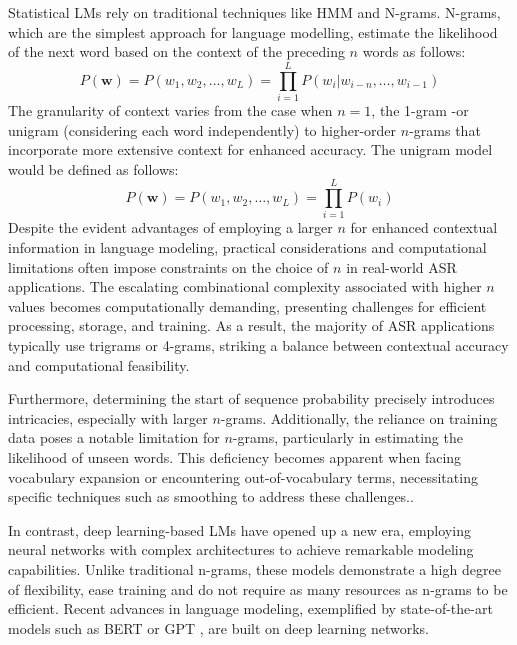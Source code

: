 Statistical \acp{LM} rely on traditional techniques like \ac{HMM} and N-grams. N-grams, which are the simplest approach for language modelling, estimate the likelihood of the next word based on the context of the preceding $n$ words as follows:
\begin{equation}
    P(\boldsymbol{w})= P(w_1 , w_2 ,\dots,w_L)  =\prod_{i=1}^L P(w_i| w_{i-n} , \dots,w_{i-1}  )
\end{equation}
The granularity of context varies from the case when $n=1$, the 1-gram -or unigram (considering each word independently) to higher-order $n$-grams that incorporate more extensive context for enhanced accuracy. The unigram model would be defined as follows:
\begin{equation}
    P(\boldsymbol{w})=P(w_1, w_2,\dots,w_L )  = \prod_{i=1}^L P(w_i)
\end{equation}
Despite the evident advantages of employing a larger $n$ for enhanced contextual information in language modeling, practical considerations and computational limitations often impose constraints on the choice of $n$ in real-world \ac{ASR} applications. The escalating combinational complexity associated with higher $n$ values becomes computationally demanding, presenting challenges for efficient processing, storage, and training. As a result, the majority of \ac{ASR} applications typically use trigrams or 4-grams, striking a balance between contextual accuracy and computational feasibility.

Furthermore, determining the start of sequence probability precisely introduces intricacies, especially with larger $n$-grams. Additionally, the reliance on training data poses a notable limitation for $n$-grams, particularly in estimating the likelihood of unseen words. This deficiency becomes apparent when facing vocabulary expansion or encountering out-of-vocabulary terms, necessitating specific techniques such as smoothing to address these challenges.\cite{n-grams-smoothing}.

In contrast, deep learning-based \acp{LM} have opened up a new era, employing neural networks with complex architectures to achieve remarkable modeling capabilities. Unlike traditional n-grams, these models demonstrate a high degree of flexibility, ease training and do not require as many resources as n-grams to be efficient. Recent advances in language modeling, exemplified by state-of-the-art models such as \ac{BERT} \cite{Bert} or \ac{GPT} \cite{brown2020language}, are built on deep learning networks.


